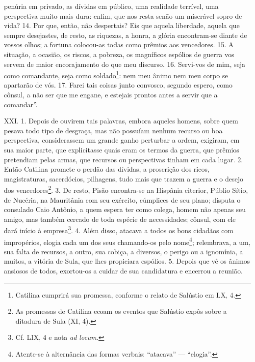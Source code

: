 penúria em privado, as dívidas em público, uma realidade terrível, uma
perspectiva muito mais dura: enfim, que nos resta senão um miserável sopro de
vida? 14. Por que, então, não despertais? Eis que aquela liberdade, aquela que
sempre desejastes, de resto, as riquezas, a honra, a glória encontram-se diante
de vossos olhos; a fortuna colocou-as todas como prêmios aos vencedores. 15. A
situação, a ocasião, os riscos, a pobreza, os magníficos espólios de guerra vos
servem de maior encorajamento do que meu discurso. 16. Servi-vos de mim, seja
como comandante, seja como soldado\footnote{Catilina cumprirá sua promessa,
conforme o relato de Salústio em LX, 4.}: nem meu ânimo nem meu corpo se
apartarão de vós. 17. Farei tais coisas junto convosco, segundo espero, como
cônsul, a não ser que me engane, e estejais prontos antes a servir que a
comandar”.

XXI. 1. Depois de ouvirem tais palavras, embora aqueles  homens, sobre quem pesava todo tipo de desgraça, mas não possuíam  nenhum recurso ou boa perspectiva,
considerassem um grande ganho perturbar a ordem, exigiram, em sua maior parte, que
explicitasse quais eram os termos da guerra, que prêmios pretendiam pelas
armas, que recursos ou perspectivas tinham em cada lugar. 2. Então Catilina
promete o perdão das dívidas, a proscrição dos ricos, magistraturas,
sacerdócios, pilhagens, tudo mais que trazem a guerra e o desejo dos
vencedores\footnote{As promessas de Catilina ecoam os eventos que Salústio
expôs sobre a ditadura de Sula (XI, 4).}. 3. De resto, Pisão encontra-se na
Hispânia citerior, Públio Sítio, de Nucéria, na Mauritânia com seu exército,
cúmplices de seu plano; disputa o consulado Caio Antônio, a quem espera ter
como colega, homem não apenas seu amigo, mas também cercado de toda espécie de
necessidades; cônsul, com ele dará início à empresa\footnote{Cf. LIX, 4 e nota \emph{ad locum}.}. 4.
Além disso, atacava a todos os bons cidadãos com impropérios, elogia cada um
dos seus chamando-os pelo nome\footnote{Atente-se à alternância das formas
verbais: ``atacava'' --- ``elogia''.}; relembrava, a um, sua falta de recursos,
a outro, sua cobiça, a diversos, o perigo ou a ignomínia, a muitos, a vitória
de Sula, que lhes propiciara espólios. 5. Depois que vê os ânimos ansiosos de
todos, exortou-os a cuidar de sua candidatura e encerrou a reunião.

